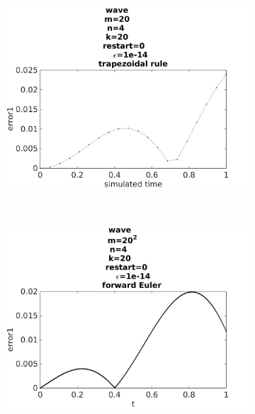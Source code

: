 \begin{figure}[H]
        \begin{subfigure}[b]{0.30\textwidth}
                \includegraphics[width=\textwidth]{../MATLAB/fig/errorovertimetrapezoidal.jpg}
                \caption{  }
                \label{fig:errorovertimetrapezoidal}
        \end{subfigure}%
        ~
        \begin{subfigure}[b]{0.30\textwidth}
                \includegraphics[width=\textwidth]{../MATLAB/fig/errorovertimeeuler.jpg}
                \caption{  }
                \label{fig:errorovertimeeuler}
        \end{subfigure}
        \begin{subfigure}[b]{0.30\textwidth}

\end{subfigure}
\end{figure}
